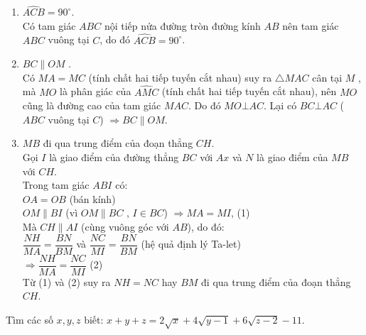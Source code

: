 \begin{ex}
{\begin{center}
\end{center}
\begin{enumerate}
	\item $\widehat{ACB}=90^\circ$.\\
	Có tam giác $ABC$ nội  tiếp nửa đường tròn đường kính $AB$ nên tam giác $ABC$ vuông tại $C$, do đó $\widehat{ACB}={90}^ \circ$.
	 \item $BC \parallel  OM$ .\\
	 Có $MA = MC$ (tính chất hai tiếp tuyến cắt nhau) suy ra $ \triangle MAC$ cân tại $M$ , mà $MO$ là phân giác của $\widehat{AMC}$ (tính chất hai tiếp tuyến cắt nhau), nên $MO$ cũng là đường cao của tam giác $MAC$. Do đó $MO\bot AC$. Lại có $BC  \bot AC$ ($ABC$ vuông tại $C$) $\Rightarrow  BC  \parallel OM$.
	 \item $MB$ đi qua trung điểm của đoạn thẳng $CH$.\\
	 Gọi $I$ là giao điểm của đường thẳng $BC$ với $Ax$ và $N$ là giao điểm của $MB$ với $CH$.\\
	 Trong tam giác $ABI$ có: \\
	 $OA = OB$ (bán kính) \\
	 $OM \parallel BI$  (vì $OM \parallel BC$ , $I\in BC$) $\Rightarrow  MA = MI$,  (1)\\
	 Mà $CH \parallel AI$ (cùng vuông góc với $AB$), do đó:\\
	 $\dfrac{NH}{MA}=\dfrac{BN}{BM}$  và   $\dfrac{NC}{MI}=\dfrac{BN}{BM}$ (hệ quả định lý Ta-let)\\ $\Rightarrow $$\dfrac{NH}{MA}=\dfrac{NC}{MI}$ (2)\\
	 Từ (1) và (2) suy ra $NH = NC$ hay $BM$ đi qua trung điểm của đoạn thẳng $CH$.
\end{enumerate}
}
\end{ex}
\begin{ex}%
Tìm các số $x,y,z$ biết: $x+y+z=2\sqrt{x}+4\sqrt{y-1}+6\sqrt{z-2}-11$.
\end{ex}

